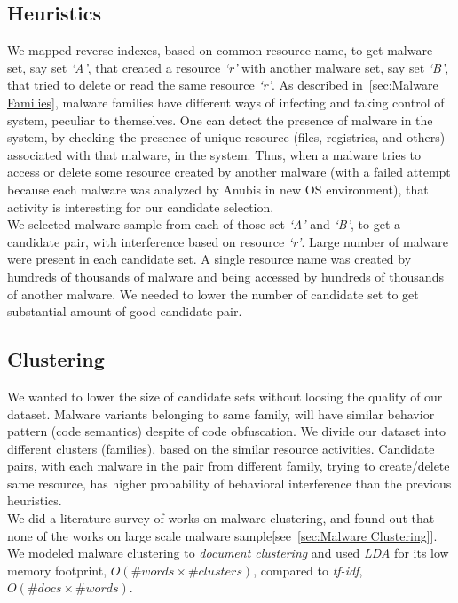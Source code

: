 \subsection{Heuristics}
\label{sub:Heuristics}
We mapped reverse indexes, based on common resource name, to get malware set, say set \emph{`A'}, that created a resource \emph{`r'} with another malware set, say set \emph{`B'}, that tried to delete or read the same resource \emph{`r'}.
As described in~\autoref{sec:Malware Families}, malware families have different ways of infecting and taking control of system, peculiar to themselves.
One can detect the presence of malware in the system, by checking the presence of unique resource (files, registries, and others) associated with that malware, in the system.
Thus, when a malware tries to access or delete some resource created by another malware (with a failed attempt because each malware was analyzed by Anubis in new OS environment), that activity is interesting for our candidate selection.\\
We selected malware sample from each of those set \emph{`A'} and \emph{`B'}, to get a candidate pair, with interference based on resource \emph{`r'}.
Large number of malware were present in each candidate set. A single resource name was created by hundreds of thousands of malware and being accessed by hundreds of thousands of another malware.
We needed to lower the number of candidate set to get substantial amount of good candidate pair.

\subsection{Clustering}
\label{sub:Clustering}
We wanted to lower the size of candidate sets without loosing the quality of our dataset.
Malware variants belonging to same family, will have similar behavior pattern (code semantics) despite of code obfuscation.
We divide our dataset into different clusters (families), based on the similar resource activities.
Candidate pairs, with each malware in the pair from different family, trying to create/delete same resource, has higher probability of behavioral interference than the previous heuristics.\\
We did a literature survey of works on malware clustering, and found out that none of the works on large scale malware sample[see~\autoref{sec:Malware Clustering}].
We modeled malware clustering to \emph{document clustering} and used \emph{LDA} for its low memory footprint, $O(\#words\times \#clusters)$, compared to \emph{tf-idf}, $O(\#docs \times \#words)$.
